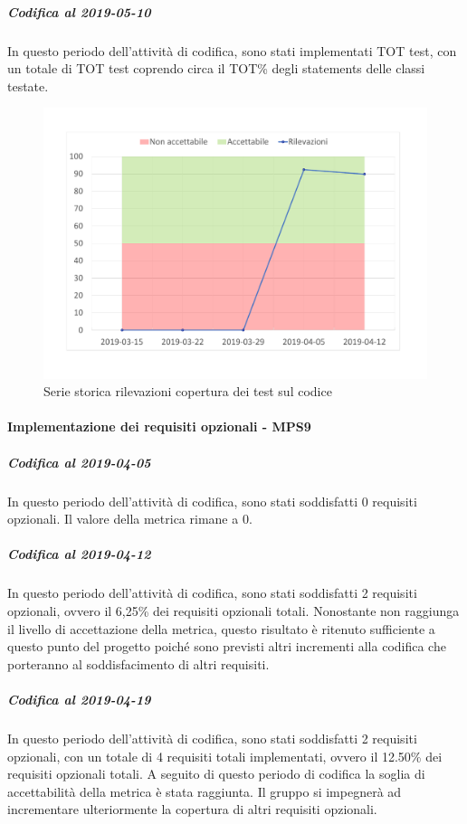\subparagraph{Codifica al 2019-05-10}
In questo periodo dell'attività di codifica, sono stati implementati TOT test, con un totale di TOT test coprendo circa il TOT\% degli statements delle classi testate.

\begin{figure}[H]
	\centering
	\includegraphics[scale=0.6]{images/resoconto/MPS8Chart.pdf}
	\caption{Serie storica rilevazioni copertura dei test sul codice}	
\end{figure}


\paragraph{Implementazione dei requisiti opzionali - MPS9}
\subparagraph{Codifica al 2019-04-05}
In questo periodo dell'attività di codifica, sono stati soddisfatti 0 requisiti opzionali. Il valore della metrica rimane a 0.

\subparagraph{Codifica al 2019-04-12}
In questo periodo dell'attività di codifica, sono stati soddisfatti 2 requisiti opzionali, ovvero il 6,25\% dei requisiti opzionali totali.
Nonostante non raggiunga il livello di accettazione della
metrica, questo risultato è ritenuto sufficiente a questo punto del progetto poiché sono previsti altri incrementi alla codifica che porteranno al soddisfacimento di altri requisiti.

\subparagraph{Codifica al 2019-04-19}
In questo periodo dell'attività di codifica, sono stati soddisfatti 2 requisiti opzionali, con un totale di 4 requisiti totali implementati, ovvero il 12.50\% dei requisiti opzionali totali.
A seguito di questo periodo di codifica la soglia di accettabilità della metrica è stata raggiunta.
Il gruppo si impegnerà ad incrementare ulteriormente la copertura di altri requisiti opzionali.

